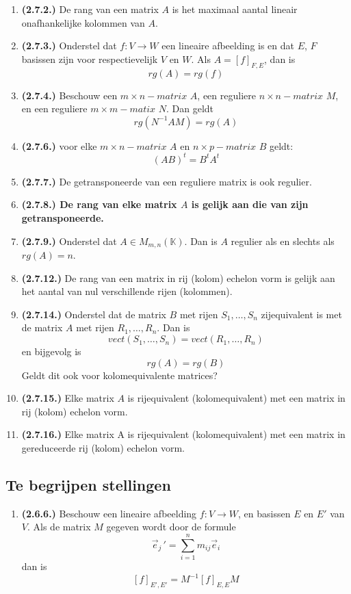 \documentclass[12pt]{article}
\begin{document}
\begin{enumerate}
        \item \textbf{(2.7.2.)} De rang van een matrix $A$ is het maximaal aantal lineair onafhankelijke kolommen van $A$.
        \item \textbf{(2.7.3.)} Onderstel dat $f:V \rightarrow W$ een lineaire afbeelding is en dat $E$, $F$ basissen zijn voor respectievelijk $V$ en $W$. Als $A=[f]_{F,E}$, dan is $$rg(A)=rg(f)$$
        \item \textbf{(2.7.4.)} Beschouw een $m \times n-matrix \, \, A$, een reguliere $n\times n-matrix \, \, M$, en een reguliere $m\times m-matix \,\, N$. Dan geldt $$rg(N^{-1}AM)=rg(A)$$
        \item \textbf{(2.7.6.)} voor elke $m \times n-matrix \,\, A$ en $n \times p - matrix \,\, B$ geldt: $$(AB)^t = B^tA^t$$
        \item \textbf{(2.7.7.)} De getransponeerde van een reguliere matrix is ook regulier.
        \item \textbf{\textbf{(2.7.8.)} De rang van elke matrix $A$ is gelijk aan die van zijn getransponeerde.}
        \item \textbf{(2.7.9.)} Onderstel dat $A\in M_{m,n}(\mathbb{K})$. Dan is $A$ regulier als en slechts als $rg(A)=n$.
        \item \textbf{(2.7.12.)} De rang van een matrix in rij (kolom) echelon vorm is gelijk aan het aantal van nul verschillende rijen (kolommen).
        \item \textbf{(2.7.14.)} Onderstel dat de matrix $B$ met rijen $S_1,\dots,S_n$ zijequivalent is met de matrix $A$ met rijen $R_1,\dots,R_n$. Dan is $$vect(S_1,\dots,S_n)=vect(R_1,\dots,R_n)$$ en bijgevolg is $$rg(A)=rg(B)$$ Geldt dit ook voor kolomequivalente matrices?
        \item \textbf{(2.7.15.)} Elke matrix $A$ is rijequivalent (kolomequivalent) met een matrix in rij (kolom) echelon vorm.
        \item \textbf{(2.7.16.)} Elke matrix A is rijequivalent (kolomequivalent) met een matrix in gereduceerde rij (kolom) echelon vorm.
    \end{enumerate}
    \subsection*{Te begrijpen stellingen}
    \begin{enumerate}
        \item \textbf{(2.6.6.)} Beschouw een lineaire afbeelding $f:V \rightarrow W$, en basissen $E$ en $E'$ van $V$. Als de matrix $M$ gegeven wordt door de formule $$\vec{e}_j\,' = \sum^n_{i=1} m_{ij}\vec{e}_i$$ dan is $$[f]_{E',E'} = M^{-1}[f]_{E,E}M$$
    \end{enumerate}
        
\end{document}
